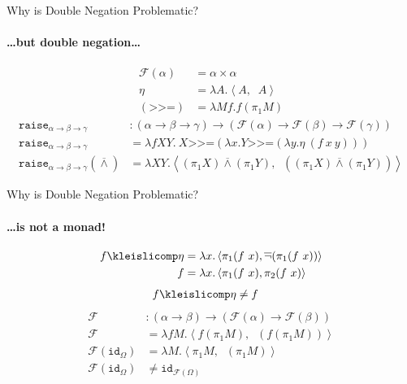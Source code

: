\documentclass{beamer}
\newcommand{\dand}{\mathbin{\overline{\land}}}
\newcommand{\dnot}{\mathop{\overline{\lnot}}}
\newcommand{\hsbind}{\mathbin{\texttt{>>=}}}
\begin{document}
\begin{frame}{Why is Double Negation Problematic?}
  \framesubtitle{\ldots but double negation\ldots}
  
  \begin{align*}
    \mathcal{F}(\alpha) &= \alpha \times \alpha \\
    \eta &= \lambda A. \left< A, \dnot A \right> \\
    (\hsbind) &= \lambda M f. f (\pi_1 M)
  \end{align*}
  \vfill
  \pause
  \begin{align*}
    \texttt{raise}_{\alpha \to \beta \to \gamma} &: (\alpha \to \beta \to \gamma) \to (\mathcal{F}(\alpha) \to \mathcal{F}(\beta) \to \mathcal{F}(\gamma)) \\
    \texttt{raise}_{\alpha \to \beta \to \gamma} &= \lambda f X Y.\ X \hsbind (\lambda x. Y \hsbind (\lambda y. \eta\ (f\ x\ y))) \\
    \texttt{raise}_{\alpha \to \beta \to \gamma}(\dand) &= \lambda X Y. \left< (\pi_1X) \dand (\pi_1Y), \dnot ((\pi_1 X) \dand (\pi_1 Y)) \right>
  \end{align*}
\end{frame}

\begin{frame}{Why is Double Negation Problematic?}
  \framesubtitle{\ldots is not a monad!}

  \begin{align*}
    f \kleislicomp \eta &= \lambda x. \left< \pi_1 (f\ x), \dnot (\pi_1 (f
    \ x))\right> \\
    f &= \lambda x. \left< \pi_1 (f\ x), \pi_2 (f\ x) \right>
  \end{align*}
  \vfill
  \pause
  \begin{align*}
    f \kleislicomp \eta &\neq f
  \end{align*}
  \vfill
  \pause
  \begin{align*}
    \mathcal{F} &: (\alpha \to \beta) \to (\mathcal{F}(\alpha) \to \mathcal{F}(\beta)) \\
    \mathcal{F} &= \lambda f M. \left< f (\pi_1 M), \dnot (f (\pi_1 M)) \right> \\
    \mathcal{F}(\texttt{id}_{\Omega}) &= \lambda M. \left< \pi_1 M, \dnot (\pi_1 M) \right> \\
    \mathcal{F}(\texttt{id}_{\Omega}) &\neq \texttt{id}_{\mathcal{F}(\Omega)}
  \end{align*}
\end{frame}
\end{document}

